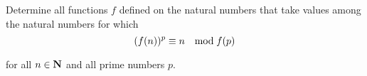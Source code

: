 Determine all functions $ f$ defined on the natural numbers that take values among the natural numbers for which\[ (f(n))^p \equiv n\quad {\rm mod}\; f(p)\]

for all $ n \in {\bf N}$ and all prime numbers $ p$.
